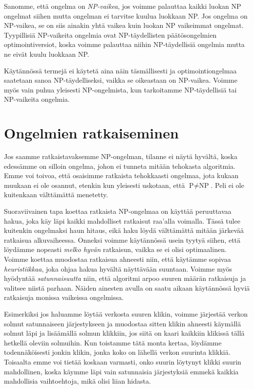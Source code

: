 Sanomme, että ongelma on \emph{NP-vaikea}, jos voimme palauttaa
kaikki luokan NP ongelmat siihen mutta ongelman ei
tarvitse kuulua luokkaan NP.
Jos ongelma on NP-vaikea, se on siis ainakin yhtä vaikea
kuin luokan NP vaikeimmat ongelmat.
Tyypillisiä NP-vaikeita ongelmia ovat NP-täydellisten
päätösongelmien optimointiversiot,
koska voimme palauttaa niihin NP-täy\-dellisiä ongelmia
mutta ne eivät kuulu luokkaan NP.

Käytännössä termejä ei käytetä aina näin täsmällisesti
ja optimointiongelmaa saatetaan sanoa NP-täydelliseksi,
vaikka se oikeastaan on NP-vaikea.
Voimme myös vain puhua yleisesti NP-ongelmista,
kun tarkoitamme NP-täydellisiä tai NP-vaikeita ongelmia.

\section{Ongelmien ratkaiseminen}

Jos saamme ratkaistavaksemme NP-ongelman,
tilanne ei näytä hy\-vältä, koska edessämme on silloin ongelma,
johon ei tunneta mitään tehokasta algoritmia.
Emme voi toivoa, että osaisimme ratkaista tehokkaasti ongelmaa,
jota kukaan muukaan ei ole osannut,
etenkin kun yleisesti uskotaan, että $\textrm{P} \neq \textrm{NP}$.
Peli ei ole kuitenkaan välttämättä menetetty.

Suoraviivainen tapa koettaa ratkaista NP-ongelmaa on 
käyttää peruuttavaa hakua, joka käy läpi kaikki mahdolliset
ratkaisut raa'alla voimalla.
Tässä tulee kuitenkin ongelmaksi haun hitaus,
eikä haku löydä välttämättä mitään järkevää ratkaisua alkuvaiheessa.
Onneksi voimme käytännössä usein tyytyä siihen,
että löydämme nopeasti \emph{melko hyvän} ratkaisun,
vaikka se ei olisi optimaalinen.
Voimme koettaa muodostaa ratkaisua ahneesti niin,
että käytämme sopivaa \emph{heuristiikkaa},
joka ohjaa hakua hyvältä näyttävään suuntaan.
Voimme myös hyödyntää \emph{satunnaisuutta} niin,
että algoritmi arpoo suuren määrän ratkaisuja
ja valitsee niistä parhaan.
Näiden ainesten avulla on saatu aikaan käytännössä
hyviä ratkaisuja monissa vaikeissa ongelmissa.

Esimerkiksi jos haluamme löytää verkosta suuren klikin,
voimme järjestää verkon solmut satunnaiseen järjestykseen
ja muodostaa sitten klikin ahneesti käymällä solmut läpi ja lisäämällä
solmun klikkiin, jos siitä on kaari kaikkiin klikissä
tällä hetkellä oleviin solmuihin.
Kun toistamme tätä monta kertaa, löydämme todennäköisesti
jonkin klikin, jonka koko on lähellä verkon suurinta klikkiä.
Toisaalta emme voi tietää koskaan varmasti,
onko suurin löytynyt klikki suurin mahdollinen,
koska käymme läpi vain satunnaisia järjestyksiä emmekä
kaikkia mahdollisia vaihtoehtoja, mikä olisi liian hidasta.

